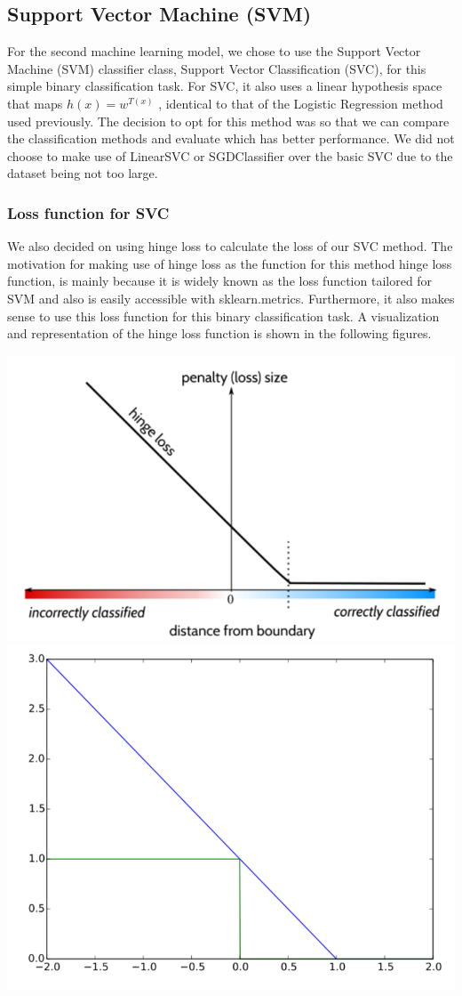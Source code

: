 \documentclass[a4paper,12pt]{article}
\begin{document}
\subsection{Support Vector Machine (SVM)}
\label{sec:org502ce96}
For the second machine learning model, we chose to use the Support Vector Machine (SVM) classifier class, Support Vector Classification (SVC), for this simple binary classification task. For SVC, it also uses a linear hypothesis space that maps \(h(x) = w^{T(x)}\) , identical to that of the Logistic Regression method used previously. The decision to opt for this method was so that we can compare the classification methods and evaluate which has better performance. We did not choose to make use of LinearSVC or SGDClassifier over the basic SVC due to the dataset being not too large.
\subsubsection{Loss function for SVC}
\label{sec:org673e720}

We also decided on using hinge loss to calculate the loss of our SVC method. The motivation for making use of hinge loss as the function for this method hinge loss function, is mainly because it is widely known as the loss function tailored for SVM and also is easily accessible with sklearn.metrics. Furthermore, it also makes sense to use this loss function for this binary classification task. A visualization and representation of the hinge loss function is shown in the following figures.



\includegraphics[height=0.3\textwidth]{./graphs/svc_1.png}
\includegraphics[height=0.3\textwidth]{./graphs/svc_2.png}
\end{document}
